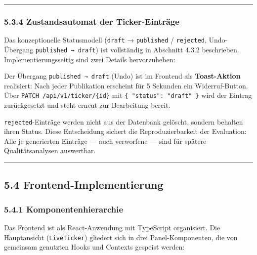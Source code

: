 \begin{center}\rule{0.5\linewidth}{0.5pt}\end{center}

\subsubsection{5.3.4 Zustandsautomat der
Ticker-Einträge}\label{zustandsautomat-der-ticker-eintruxe4ge}

Das konzeptionelle Statusmodell (\texttt{draft} → \texttt{published} /
\texttt{rejected}, Undo-Übergang \texttt{published\ →\ draft}) ist
vollständig in Abschnitt 4.3.2 beschrieben. Implementierungsseitig sind
zwei Details hervorzuheben:

Der Übergang \texttt{published\ →\ draft} (Undo) ist im Frontend als
\textbf{Toast-Aktion} realisiert: Nach jeder Publikation erscheint für 5
Sekunden ein Widerruf-Button. Über \texttt{PATCH\ /api/v1/ticker/\{id\}}
mit \texttt{\{\ "status":\ "draft"\ \}} wird der Eintrag zurückgesetzt
und steht erneut zur Bearbeitung bereit.

\texttt{rejected}-Einträge werden nicht aus der Datenbank gelöscht,
sondern behalten ihren Status. Diese Entscheidung sichert die
Reproduzierbarkeit der Evaluation: Alle je generierten Einträge --- auch
verworfene --- sind für spätere Qualitätsanalysen auswertbar.

\begin{center}\rule{0.5\linewidth}{0.5pt}\end{center}

\subsection{5.4
Frontend-Implementierung}\label{frontend-implementierung}

\subsubsection{5.4.1 Komponentenhierarchie}\label{komponentenhierarchie}

Das Frontend ist als React-Anwendung mit TypeScript organisiert. Die
Hauptansicht (\texttt{LiveTicker}) gliedert sich in drei
Panel-Komponenten, die von gemeinsam genutzten Hooks und Contexts
gespeist werden:

